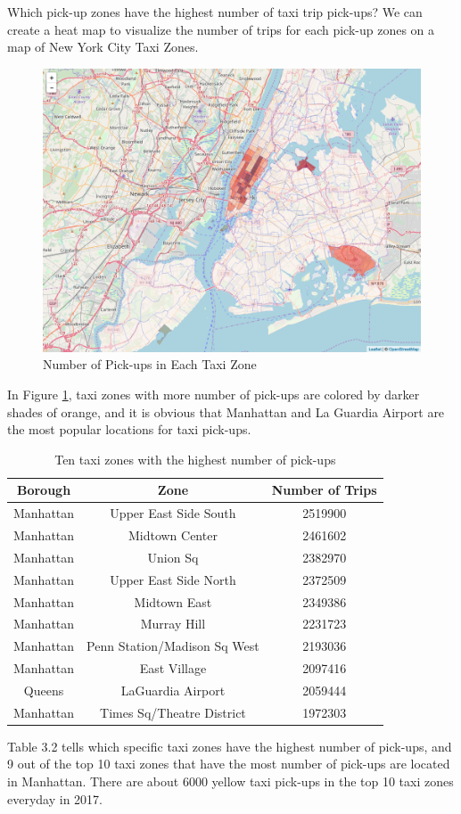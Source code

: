 \documentclass[12pt,twoside]{reedthesis}
\theoremstyle{definition}
\theoremstyle{definition}
\theoremstyle{definition}
\theoremstyle{remark}
\begin{document}
Which pick-up zones have the highest number of taxi trip pick-ups? We
can create a heat map to visualize the number of trips for each pick-up
zones on a map of New York City Taxi Zones.
\begin{figure}[h]

{\centering \includegraphics[width=5.84in]{figure/num_trip} 

}

\caption{Number of Pick-ups in Each Taxi Zone}\label{fig:num-trip}
\end{figure}
In Figure \ref{fig:num-trip}, taxi zones with more number of pick-ups
are colored by darker shades of orange, and it is obvious that Manhattan
and La Guardia Airport are the most popular locations for taxi pick-ups.
\begin{table}

\caption{\label{tab:unnamed-chunk-42}Ten taxi zones with the highest number of pick-ups}
\centering
\begin{tabular}[t]{ccc}
\toprule
Borough & Zone & Number of Trips\\
\midrule
Manhattan & Upper East Side South & 2519900\\
Manhattan & Midtown Center & 2461602\\
Manhattan & Union Sq & 2382970\\
Manhattan & Upper East Side North & 2372509\\
Manhattan & Midtown East & 2349386\\
\addlinespace
Manhattan & Murray Hill & 2231723\\
Manhattan & Penn Station/Madison Sq West & 2193036\\
Manhattan & East Village & 2097416\\
Queens & LaGuardia Airport & 2059444\\
Manhattan & Times Sq/Theatre District & 1972303\\
\bottomrule
\end{tabular}
\end{table}
Table 3.2 tells which specific taxi zones have the highest number of
pick-ups, and 9 out of the top 10 taxi zones that have the most number
of pick-ups are located in Manhattan. There are about 6000 yellow taxi
pick-ups in the top 10 taxi zones everyday in 2017.
\end{document}
